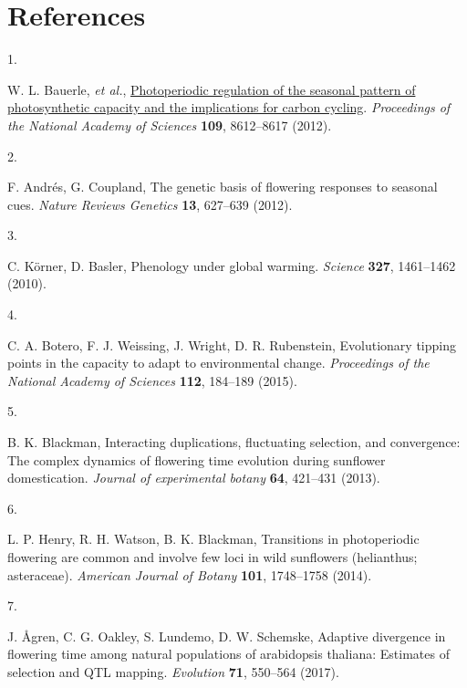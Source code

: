 \documentclass[
  9pt,
  twocolumn,
  twoside]{pnas-new}
\newlength{\cslhangindent}
\newlength{\csllabelwidth}
\newenvironment{CSLReferences}[2] %
 {\begin{list}{}{%
  \setlength{\itemindent}{0pt}
  \setlength{\leftmargin}{0pt}
  \setlength{\parsep}{0pt}
  \ifodd #1
   \setlength{\leftmargin}{\cslhangindent}
   \setlength{\itemindent}{-1\cslhangindent}
  \fi
  \setlength{\itemsep}{#2\baselineskip}}}
 {\end{list}}
\newcommand{\CSLLeftMargin}[1]{\parbox[t]{\csllabelwidth}{\strut#1\strut}}
\newcommand{\CSLRightInline}[1]{\parbox[t]{\linewidth - \csllabelwidth}{\strut#1\strut}}
\begin{document}
\section{References}\label{references}

\bibsplit[2]

\label{refs}
\begin{CSLReferences}{0}{1}
\CSLLeftMargin{1. }%
\CSLRightInline{W. L. Bauerle, \emph{et al.},
\href{https://doi.org/10.1073/pnas.1119131109}{Photoperiodic regulation
of the seasonal pattern of photosynthetic capacity and the implications
for carbon cycling}. \emph{Proceedings of the National Academy of
Sciences} \textbf{109}, 8612--8617 (2012).}

\CSLLeftMargin{2. }%
\CSLRightInline{F. Andrés, G. Coupland, The genetic basis of flowering
responses to seasonal cues. \emph{Nature Reviews Genetics} \textbf{13},
627--639 (2012).}

\CSLLeftMargin{3. }%
\CSLRightInline{C. Körner, D. Basler, Phenology under global warming.
\emph{Science} \textbf{327}, 1461--1462 (2010).}

\CSLLeftMargin{4. }%
\CSLRightInline{C. A. Botero, F. J. Weissing, J. Wright, D. R.
Rubenstein, Evolutionary tipping points in the capacity to adapt to
environmental change. \emph{Proceedings of the National Academy of
Sciences} \textbf{112}, 184--189 (2015).}

\CSLLeftMargin{5. }%
\CSLRightInline{B. K. Blackman, Interacting duplications, fluctuating
selection, and convergence: The complex dynamics of flowering time
evolution during sunflower domestication. \emph{Journal of experimental
botany} \textbf{64}, 421--431 (2013).}

\CSLLeftMargin{6. }%
\CSLRightInline{L. P. Henry, R. H. Watson, B. K. Blackman, Transitions
in photoperiodic flowering are common and involve few loci in wild
sunflowers (helianthus; asteraceae). \emph{American Journal of Botany}
\textbf{101}, 1748--1758 (2014).}

\CSLLeftMargin{7. }%
\CSLRightInline{J. Ågren, C. G. Oakley, S. Lundemo, D. W. Schemske,
Adaptive divergence in flowering time among natural populations of
arabidopsis thaliana: Estimates of selection and QTL mapping.
\emph{Evolution} \textbf{71}, 550--564 (2017).}


\end{CSLReferences}
\end{document}
